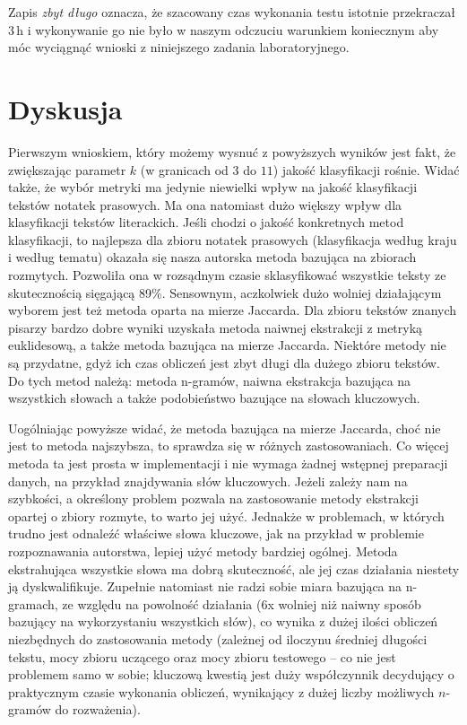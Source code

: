 \documentclass[a4paper]{classrep}
\begin{document}
Zapis \emph{zbyt długo} oznacza, że szacowany czas wykonania testu istotnie przekraczał $3\,\mbox{h}$ i wykonywanie
go nie było w naszym odczuciu warunkiem koniecznym aby móc wyciągnąć wnioski z niniejszego zadania laboratoryjnego.

\section{Dyskusja}
Pierwszym wnioskiem, który możemy wysnuć z powyższych wyników jest fakt, że zwiększając parametr \(k\) (w granicach od \(3\) do \(11\)) jakość klasyfikacji rośnie. Widać także,
że wybór metryki ma jedynie niewielki wpływ na jakość klasyfikacji tekstów notatek prasowych. Ma ona natomiast dużo większy wpływ dla klasyfikacji tekstów literackich.
Jeśli chodzi o jakość konkretnych metod klasyfikacji, to najlepsza dla zbioru notatek prasowych (klasyfikacja według kraju i według tematu)
okazała się nasza autorska metoda bazująca na zbiorach rozmytych. Pozwoliła ona w rozsądnym czasie sklasyfikować wszystkie teksty ze skutecznością sięgającą 89\%. Sensownym, aczkolwiek
dużo wolniej działającym wyborem jest też metoda oparta na mierze Jaccarda.
Dla zbioru tekstów znanych pisarzy bardzo dobre wyniki uzyskała metoda naiwnej ekstrakcji z metryką euklidesową,
a także metoda bazująca na mierze Jaccarda. Niektóre metody nie są przydatne, gdyż ich czas obliczeń jest zbyt długi dla dużego zbioru tekstów. Do tych metod należą:
metoda n-gramów, naiwna ekstrakcja bazująca na wszystkich słowach a także podobieństwo bazujące na słowach kluczowych.

Uogólniając powyższe widać, że metoda bazująca na mierze Jaccarda, choć nie jest to metoda najszybsza, to sprawdza się w różnych zastosowaniach. Co więcej metoda ta jest
prosta w implementacji i nie wymaga żadnej wstępnej preparacji danych, na przykład znajdywania słów kluczowych. Jeżeli zależy nam na szybkości, a określony problem pozwala
na zastosowanie metody ekstrakcji opartej o zbiory rozmyte, to warto jej użyć. Jednakże w problemach, w których trudno jest odnaleźć właściwe słowa kluczowe, jak na przykład
w problemie rozpoznawania autorstwa, lepiej użyć metody bardziej ogólnej. Metoda ekstrahująca wszystkie słowa ma dobrą skuteczność, ale jej czas działania  niestety ją dyskwalifikuje.
Zupełnie natomiast nie radzi sobie miara bazująca na n-gramach, ze względu na powolność działania (\(6\)x wolniej niż naiwny sposób bazujący na wykorzystaniu wszystkich słów), co wynika z dużej ilości obliczeń niezbędnych do zastosowania metody (zależnej od iloczynu średniej długości tekstu, mocy zbioru uczącego oraz mocy zbioru testowego -- co nie jest problemem samo w sobie; kluczową kwestią jest duży współczynnik decydujący o praktycznym czasie wykonania obliczeń, wynikający z dużej liczby możliwych $n$-gramów do rozważenia). 
\end{document}
